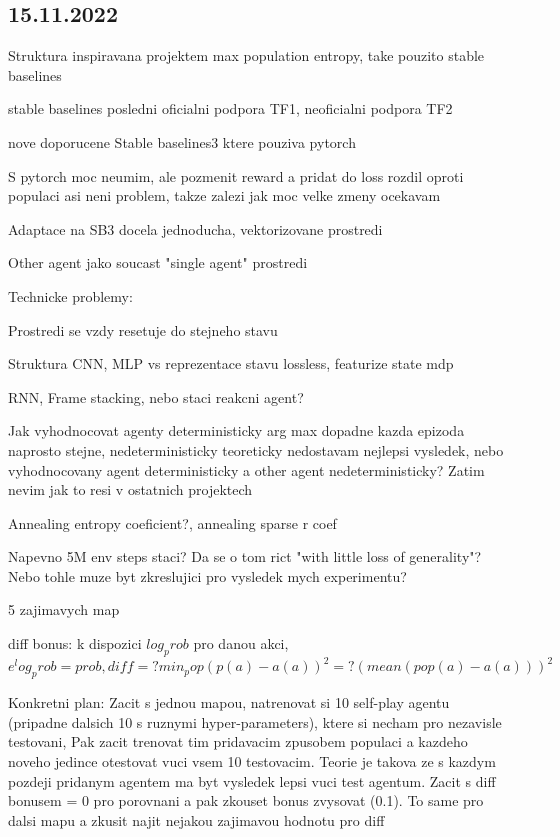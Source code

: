 \documentclass{report}
\begin{document}
\subsection*{15.11.2022}
\begin{list}{}{}
    \item Struktura inspiravana projektem max population entropy, take pouzito stable baselines
    \item stable baselines posledni oficialni podpora TF1, neoficialni podpora TF2
    \item nove doporucene Stable baselines3 ktere pouziva pytorch
    \item S pytorch moc neumim, ale pozmenit reward a pridat do loss rozdil oproti populaci asi neni problem, takze zalezi jak moc velke zmeny ocekavam
    \item Adaptace na SB3 docela jednoducha, vektorizovane prostredi
    \item Other agent jako soucast "single agent" prostredi
    
    Technicke problemy:
    \item Prostredi se vzdy resetuje do stejneho stavu
    \item Struktura CNN, MLP vs reprezentace stavu lossless, featurize state mdp
    \item RNN, Frame stacking, nebo staci reakcni agent?
    \item Jak vyhodnocovat agenty deterministicky arg max dopadne kazda epizoda naprosto stejne, nedeterministicky teoreticky nedostavam nejlepsi vysledek, nebo vyhodnocovany agent deterministicky a other agent nedeterministicky? Zatim nevim jak to resi v ostatnich projektech
    \item Annealing entropy coeficient?, annealing sparse r coef
    \item Napevno 5M env steps staci? Da se o tom rict "with little loss of generality"? Nebo tohle muze byt zkreslujici pro vysledek mych experimentu?
    \item 5 zajimavych map
    \item diff bonus: k dispozici $log_prob$ pro danou akci, $e^log_prob = prob, diff =? min_pop(p(a) - a(a))^2 =? (mean(pop(a) - a(a)))^2$
    \item Konkretni plan: Zacit s jednou mapou, natrenovat si 10 self-play agentu (pripadne dalsich 10 s ruznymi hyper-parameters), ktere si necham pro nezavisle testovani,
        Pak zacit trenovat tim pridavacim zpusobem populaci a kazdeho noveho jedince otestovat vuci vsem 10 testovacim. Teorie je takova ze s kazdym pozdeji pridanym agentem ma byt vysledek lepsi vuci test agentum.
        Zacit s diff bonusem = 0 pro porovnani a pak zkouset bonus zvysovat (0.1).
        To same pro dalsi mapu a zkusit najit nejakou zajimavou hodnotu pro diff 

\end{list}
\end{document}
